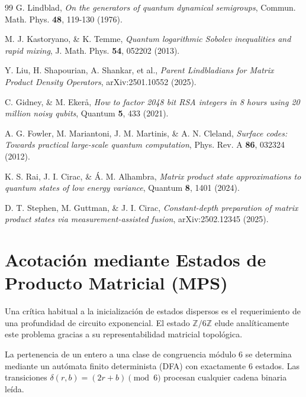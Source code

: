 \documentclass[12pt,a4paper]{article}
\theoremstyle{plain}
\theoremstyle{definition}
\theoremstyle{remark}
\begin{document}
\begin{thebibliography}{99}
G. Lindblad, \textit{On the generators of quantum dynamical semigroups}, Commun. Math. Phys. \textbf{48}, 119-130 (1976).

M. J. Kastoryano, \& K. Temme, \textit{Quantum logarithmic Sobolev inequalities and rapid mixing}, J. Math. Phys. \textbf{54}, 052202 (2013).

Y. Liu, H. Shapourian, A. Shankar, et al., \textit{Parent Lindbladians for Matrix Product Density Operators}, arXiv:2501.10552 (2025).

C. Gidney, \& M. Ekerå, \textit{How to factor 2048 bit RSA integers in 8 hours using 20 million noisy qubits}, Quantum \textbf{5}, 433 (2021).

A. G. Fowler, M. Mariantoni, J. M. Martinis, \& A. N. Cleland, \textit{Surface codes: Towards practical large-scale quantum computation}, Phys. Rev. A \textbf{86}, 032324 (2012).

K. S. Rai, J. I. Cirac, \& Á. M. Alhambra, \textit{Matrix product state approximations to quantum states of low energy variance}, Quantum \textbf{8}, 1401 (2024).

D. T. Stephen, M. Guttman, \& J. I. Cirac, \textit{Constant-depth preparation of matrix product states via measurement-assisted fusion}, arXiv:2502.12345 (2025).

\end{thebibliography}

\appendix

\section{Acotación mediante Estados de Producto Matricial (MPS)}
\label{app:mps}

Una crítica habitual a la inicialización de estados dispersos es el requerimiento de una profundidad de circuito exponencial. El estado $\mathbb{Z}/6\mathbb{Z}$ elude analíticamente este problema gracias a su representabilidad matricial topológica.

La pertenencia de un entero a una clase de congruencia módulo $6$ se determina mediante un autómata finito determinista (DFA) con exactamente $6$ estados. Las transiciones $\delta(r,b) = (2r+b) \pmod 6$ procesan cualquier cadena binaria leída.
\end{document}
